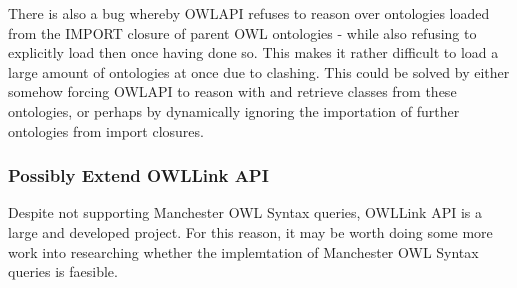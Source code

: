 \documentclass{article}
\begin{document}
There is also a bug whereby OWLAPI refuses to reason over ontologies loaded from
the IMPORT closure of parent OWL ontologies - while also refusing to explicitly
load then once having done so. This makes it rather difficult to load a large
amount of ontologies at once due to clashing. This could be solved by either
somehow forcing OWLAPI to reason with and retrieve classes from these
ontologies, or perhaps by dynamically ignoring the importation of further
ontologies from import closures.

\subsubsection{Possibly Extend OWLLink API}

Despite not supporting Manchester OWL Syntax queries, OWLLink API is a large and
developed project. For this reason, it may be worth doing some
more work into researching whether the implemtation of Manchester OWL Syntax
queries is faesible.
\end{document}
